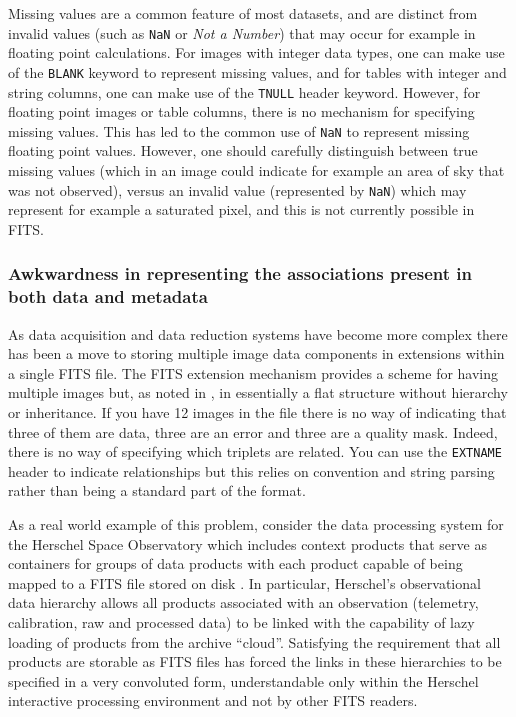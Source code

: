 \documentclass[final,authoryear,5p,times,twocolumn]{elsarticle}
\begin{document}
{{Missing values are a common feature of most datasets, and are distinct from
invalid values (such as \texttt{NaN} or \textit{Not a Number}) that may occur
for example in floating point calculations. For images with integer data
types, one can make use of the \texttt{BLANK} keyword to represent missing
values, and for tables with integer and string columns, one can make use of
the \texttt{TNULL} header keyword. However, for floating point images or
table columns, there is no mechanism for specifying missing values. This has
led to the common use of \texttt{NaN} to represent missing floating point
values. However, one should carefully distinguish between true missing values
(which in an image could indicate for example an area of sky that was not
observed), versus an invalid value (represented by \texttt{NaN}) which may
represent for example a saturated pixel, and this is not currently possible
in FITS.


\subsubsection{Awkwardness in representing the associations present in both data and metadata}
\label{section_associations}


As data acquisition and data reduction systems have become more
complex there has been a move to storing multiple image data
components in extensions within a single FITS file. The FITS extension
mechanism provides a scheme for having multiple images but, as noted
in \citet{2003ASSL..285...71G}, in essentially a flat structure
without hierarchy or inheritance. If you have 12 images in the file
there is no way of indicating that three of them are data, three are an error
and three are a quality mask. Indeed, there is no way of specifying which
triplets are related. You can use the \texttt{EXTNAME} header to
indicate relationships but this relies on convention and string
parsing rather than being a standard part of the format.


As a real world example of this problem, consider the data processing 
system for the Herschel Space Observatory which includes 
context products that serve as containers for groups of data products 
with each product capable of being mapped to a 
FITS file stored on disk 
\citep[see the Herschel architecture and design document][]{2008HerschelDesign}.
In particular, Herschel's observational data 
hierarchy allows all products associated with an observation (telemetry, 
calibration, raw and processed data) to be linked with the capability of 
lazy loading of products from the archive ``cloud''. 
Satisfying the requirement that all products are storable as FITS files 
has forced the links in these hierarchies to be specified in a very 
convoluted form, understandable only within the 
Herschel interactive processing environment
\citep[HIPE;][]{2010ASPC..434..139O} and not by other FITS readers.


}}
\end{document}
